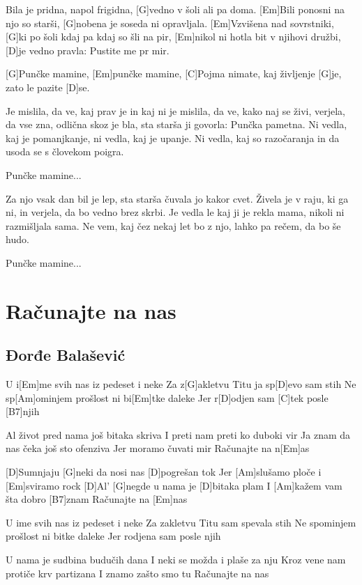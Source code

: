 \documentclass[a4paper,12pt]{article}
\begin{document}
\begin{multicols}{2}
\begin{guitar}
[Em]Bila je pridna, napol frigidna,
[G]vedno v šoli ali pa doma.
[Em]Bili ponosni na njo so starši, 
[G]nobena je soseda ni opravljala.
[Em]Vzvišena nad sovrstniki, 
[G]ki po šoli kdaj pa kdaj so šli na pir,
[Em]nikol ni hotla bit v njihovi družbi, 
[D]je vedno pravla: Pustite me pr mir.


[G]Punčke mamine, [Em]punčke mamine,
[C]Pojma nimate, kaj življenje [G]je,
zato le pazite [D]se.


Je mislila, da ve, kaj prav je in kaj ni
je mislila, da ve, kako naj se živi,
verjela, da vse zna, odlična skoz je bla,
sta starša ji govorla: Punčka pametna.
Ni vedla, kaj je pomanjkanje, 
ni vedla, kaj je upanje.
Ni vedla, kaj so razočaranja 
in da usoda se s človekom poigra.


Punčke mamine...


Za njo vsak dan bil je lep,
sta starša čuvala jo kakor cvet.
Živela je v raju, ki ga ni, 
in verjela, da bo vedno brez skrbi.
Je vedla le kaj ji je rekla mama, 
nikoli ni razmišljala sama.
Ne vem, kaj čez nekaj let bo z njo,
lahko pa rečem, da bo še hudo.


Punčke mamine...

\end{guitar}
\section{Računajte na nas}
\subsection*{Đorđe Balašević}
\begin{guitar}

U i[Em]me svih nas iz pedeset i neke
Za z[G]akletvu Titu ja sp[D]evo sam stih
Ne sp[Am]ominjem prošlost ni bi[Em]tke daleke
Jer r[D]odjen sam [C]tek posle [B7]njih


Al život pred nama još bitaka skriva
I preti nam preti ko duboki vir
Ja znam da nas čeka još sto ofenziva
Jer moramo čuvati mir
Računajte na n[Em]as


[D]Sumnjaju [G]neki da nosi nas [D]pogrešan tok
Jer [Am]slušamo ploče i [Em]sviramo rock
[D]Al' [G]negde u nama je [D]bitaka plam
I [Am]kažem vam šta dobro [B7]znam
Računajte na [Em]nas


U ime svih nas iz pedeset i neke
Za zakletvu Titu sam spevala stih
Ne spominjem prošlost ni bitke daleke
Jer rodjena sam posle njih


U nama je sudbina budučih dana
I neki se možda i plaše za nju
Kroz vene nam protiče krv partizana
I znamo zašto smo tu
Računajte na nas



\end{guitar}
\end{multicols}
\end{document}
